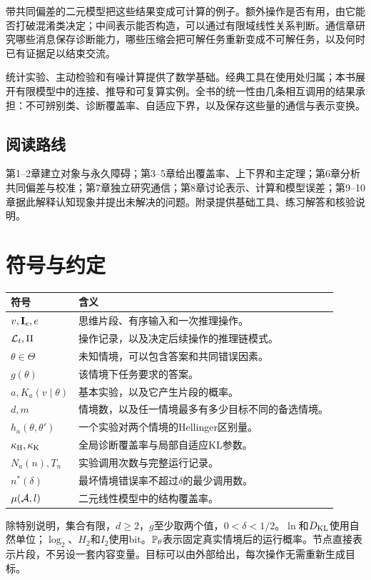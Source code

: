 带共同偏差的二元模型把这些结果变成可计算的例子。额外操作是否有用，由它能否打破混淆类决定；中间表示能否构造，可以通过有限域线性关系判断。通信章研究哪些消息保存诊断能力，哪些压缩会把可解任务重新变成不可解任务，以及何时已有证据足以结束交流。

统计实验、主动检验和有噪计算提供了数学基础。经典工具在使用处归属；本书展开有限模型中的连接、推导和可复算实例。全书的统一性由几条相互调用的结果承担：不可辨别类、诊断覆盖率、自适应下界，以及保存这些量的通信与表示变换。

\section*{阅读路线}
第1--2章建立对象与永久障碍；第3--5章给出覆盖率、上下界和主定理；第6章分析共同偏差与校准；第7章独立研究通信；第8章讨论表示、计算和模型误差；第9--10章据此解释认知现象并提出未解决的问题。附录提供基础工具、练习解答和核验说明。

\chapter*{符号与约定}
\begin{longtable}{p{}p{}}
\toprule
符号 & 含义\\\midrule
$v,\mathbf I_e,e$ & 思维片段、有序输入和一次推理操作。\\
$\mathcal L_t,\Pi$ & 操作记录，以及决定后续操作的推理链模式。\\
$\theta\in\Theta$ & 未知情境，可以包含答案和共同错误因素。\\
$g(\theta)$ & 该情境下任务要求的答案。\\
$a,K_a(v\mid\theta)$ & 基本实验，以及它产生片段的概率。\\
$d,m$ & 情境数，以及任一情境最多有多少目标不同的备选情境。\\
$h_a(\theta,\theta')$ & 一个实验对两个情境的Hellinger区别量。\\
$\kappa_{\mathrm H},\kappa_{\mathrm K}$ & 全局诊断覆盖率与局部自适应KL参数。\\
$N_a(n),T_n$ & 实验调用次数与完整运行记录。\\
$n^*(\delta)$ & 最坏情境错误率不超过$\delta$的最少调用数。\\
$\mu(\mathcal A,l)$ & 二元线性模型中的结构覆盖率。\\
\bottomrule
\end{longtable}
除特别说明，集合有限，$d\ge2$，$g$至少取两个值，$0<\delta<1/2$。$\ln$和$D_{\mathrm{KL}}$使用自然单位；$\log_2$、$H_2$和$I_2$使用bit。$\mathbb P_\theta$表示固定真实情境后的运行概率。节点直接表示片段，不另设一套内容变量。目标可以由外部给出，每次操作无需重新生成目标。
